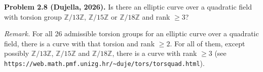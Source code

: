 \textbf{Problem 2.8 (Dujella, 2026).} Is there an elliptic curve over a quadratic field with torsion group $\mathbb{Z}/13\mathbb{Z}$, $\mathbb{Z}/15\mathbb{Z}$ or $\mathbb{Z}/18\mathbb{Z}$ and rank $\geqslant 3$?

\medskip

\textit{Remark.} For all 26 admissible torsion groups for an elliptic curve over a quadratic field, there is a curve with that torsion and rank $\geqslant 2$. For all of them, except possibly $\mathbb{Z}/13\mathbb{Z}$, $\mathbb{Z}/15\mathbb{Z}$ and $\mathbb{Z}/18\mathbb{Z}$, there is a curve with rank $\geqslant 3$ (see \texttt{https://web.math.pmf.unizg.hr/\textasciitilde duje/tors/torsquad.html}).
